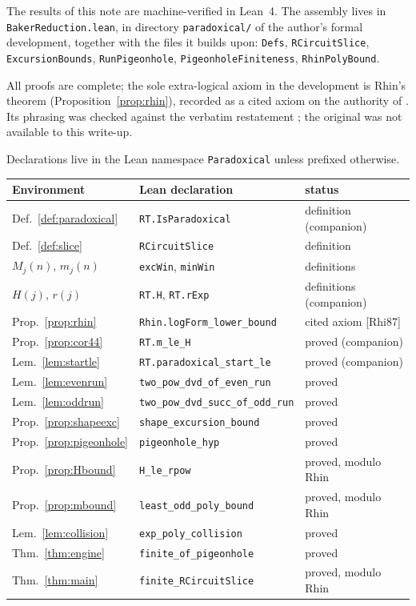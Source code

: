 \documentclass[11pt]{amsart}
\theoremstyle{plain}
\theoremstyle{definition}
\theoremstyle{remark}
\begin{document}
{\sloppy
The results of this note are machine-verified in Lean~4.  The assembly
lives in \texttt{BakerReduction.lean}, in directory \texttt{paradoxical/}
of the author's formal development, together with the files it builds upon:
\texttt{Defs}, \texttt{RCircuitSlice}, \texttt{ExcursionBounds},
\texttt{RunPigeonhole}, \texttt{PigeonholeFiniteness},
\texttt{RhinPolyBound}.\par}  All proofs are
complete; the sole extra-logical axiom in the development is Rhin's theorem
(Proposition~\ref{prop:rhin}), recorded as a cited axiom on the authority of
\cite{Rhi87}.  Its phrasing was checked against the verbatim restatement
\cite[Prop.~6.3]{Roz25}; the original \cite{Rhi87} was not available to this
write-up.

Declarations live in the Lean namespace \texttt{Paradoxical} unless
prefixed otherwise.

\begin{center}
\footnotesize
\begin{tabular}{lll}
\toprule
Environment & Lean declaration & status \\
\midrule
Def.~\ref{def:paradoxical} & \texttt{RT.IsParadoxical} & definition (companion) \\
Def.~\ref{def:slice} & \texttt{RCircuitSlice} & definition \\
$M_j(n)$, $m_j(n)$ & \texttt{excWin}, \texttt{minWin} & definitions \\
$H(j)$, $r(j)$ & \texttt{RT.H}, \texttt{RT.rExp} & definitions (companion) \\
Prop.~\ref{prop:rhin} & \texttt{Rhin.logForm\_lower\_bound} & cited axiom [Rhi87] \\
Prop.~\ref{prop:cor44} & \texttt{RT.m\_le\_H} & proved (companion) \\
Lem.~\ref{lem:startle} & \texttt{RT.paradoxical\_start\_le} & proved (companion) \\
Lem.~\ref{lem:evenrun} & \texttt{two\_pow\_dvd\_of\_even\_run} & proved \\
Lem.~\ref{lem:oddrun} & \texttt{two\_pow\_dvd\_succ\_of\_odd\_run} & proved \\
Prop.~\ref{prop:shapeexc} & \texttt{shape\_excursion\_bound} & proved \\
Prop.~\ref{prop:pigeonhole} & \texttt{pigeonhole\_hyp} & proved \\
Prop.~\ref{prop:Hbound} & \texttt{H\_le\_rpow} & proved, modulo Rhin \\
Prop.~\ref{prop:mbound} & \texttt{least\_odd\_poly\_bound} & proved, modulo Rhin \\
Lem.~\ref{lem:collision} & \texttt{exp\_poly\_collision} & proved \\
Thm.~\ref{thm:engine} & \texttt{finite\_of\_pigeonhole} & proved \\
Thm.~\ref{thm:main} & \texttt{finite\_RCircuitSlice} & proved, modulo Rhin \\
\bottomrule
\end{tabular}
\end{center}
\end{document}
